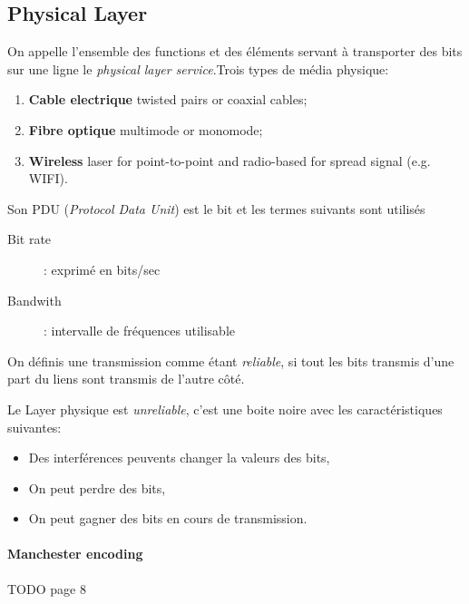 \subsection{Physical Layer}
On appelle l'ensemble des functions et des éléments servant à transporter des bits sur une ligne le \textit{physical layer service}.Trois types de média physique:
\begin{enumerate}
  \item \textbf{Cable electrique} twisted pairs or coaxial cables;
  \item \textbf{Fibre optique} multimode or monomode;
  \item \textbf{Wireless} laser for point-to-point and radio-based for spread signal (e.g. WIFI).
\end{enumerate}

Son PDU (\textit{Protocol Data Unit}) est le bit et les termes suivants sont utilisés
\begin{description}
    \item[Bit rate] : exprimé en bits/sec
    \item[Bandwith] : intervalle de fréquences utilisable
\end{description}

On définis une transmission comme étant \textit{reliable}, si tout les bits transmis d'une part du liens sont transmis de l'autre côté.

Le Layer physique est \textit{unreliable}, c'est une boite noire avec les caractéristiques suivantes:
\begin{itemize}
  \item Des interférences peuvents changer la valeurs des bits,
  \item On peut perdre des bits,
  \item On peut gagner des bits en cours de transmission.
\end{itemize}

\paragraph{Manchester encoding}
TODO page 8

